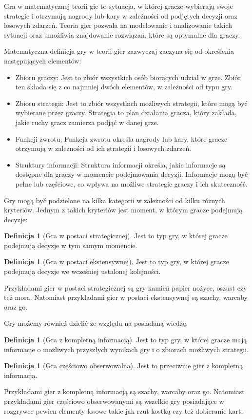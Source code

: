 \documentclass[inzynierska]{pwr_wmat_praca_dyplomowa}
\theoremstyle{plain}
\numberwithin{theorem}{chapter}
\theoremstyle{definition}
\numberwithin{theorem}{chapter}
\newtheorem{definition}[theorem]{Definicja}
\begin{document}
Gra w matematycznej teorii gie to sytuacja, w której gracze wybierają swoje strategie i otrzymują nagrody lub kary w zależności od podjętych decyzji  oraz losowych zdarzeń. Teoria gier pozwala na modelowanie i analizowanie takich sytuacji oraz umożliwia znajdowanie rozwiązań, które są optymalne dla graczy.

Matematyczna definicja gry w teorii gier zazwyczaj zaczyna się od określenia następujących elementów:

\begin{itemize}
	\item Zbioru graczy: Jest to zbiór wszystkich osób biorących udział w grze. Zbiór ten składa się z co najmniej dwóch elementów, w zależności od typu gry.
	
	\item Zbioru strategii: Jest to zbiór wszystkich możliwych strategii, które mogą być wybierane przez graczy. Strategia to plan działania gracza, który zakłada, jakie ruchy gracz zamierza podjąć w danej grze.
	
	\item Funkcji zwrotu: Funkcja zwrotu określa nagrody lub kary, które gracze otrzymują w zależności od ich strategii i losowych zdarzeń.
	
	\item Struktury informacji: Struktura informacji określa, jakie informacje są dostępne dla graczy w momencie podejmowania decyzji. Informacje mogą być pełne lub częściowe, co wpływa na możliwe strategie graczy i ich skuteczność.
\end{itemize}

Gry mogą być podzielone na kilka kategorii w zależności od kilku różnych kryteriów. Jednym z takich kryteriów jest moment, w którym gracze podejmują decyzje:

\begin{definition}[Gra w postaci strategicznej]
Jest to typ gry, w której gracze podejmują decyzje w tym samym
momencie.
\end{definition}
\begin{definition}[Gra w postaci ekstensywnej]
	Jest to typ gry, w której gracze podejmują decyzje we wcześniej ustalonej kolejności.
\end{definition}
Przykładami gier w postaci strategicznej są gry kamień papier nożyce, oszust czy też mora. Natomiast przykładami gier w postaci ekstensywnej są szachy, warcaby oraz go.

Gry możemy również dzielić ze względu na posiadaną wiedzę.
\begin{definition}[Gra z kompletną informacją]
	Jest to typ gry, w której gracze mają informacje o możliwych przyszłych wynikach gry i o zbiorach możliwych strategii.
\end{definition}
\begin{definition}[Gra częściowo obserwowalna]
	Jest to przeciwnie gier z kompletną informacją.
\end{definition}
Przykładami gier z kompletną informacją są szachy, warcaby oraz go.
Natomiast przykładami gier częściowo obserwowanymi są wszelkie gry posiadające w rozgrywce pewien elementy losowe takie jak rzut kostką czy też dobieranie kart. 
\end{document}
